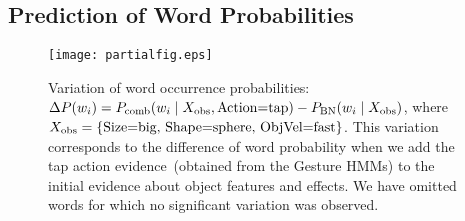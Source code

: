 
%

\subsection{Prediction of Word Probabilities}

\begin{figure}
\centering
\texttt{[image: partialfig.eps]}
\caption{Variation of word occurrence probabilities:
$\Delta P(w_i) = P_\text{comb}(w_i \mid X_\text{obs}, \text{Action=tap}) - P_{\text{BN}}(w_i \mid X_\text{obs})$, where $X_\text{obs} = \{ \text{Size=big, Shape=sphere, ObjVel=fast} \}$.
This variation corresponds to the difference of word probability when we add the tap action evidence~(obtained from the Gesture \acp{HMM}) to the initial evidence about object features and effects. We have omitted words for which no significant variation was observed.}
\label{fig:probdiff}
\end{figure}

